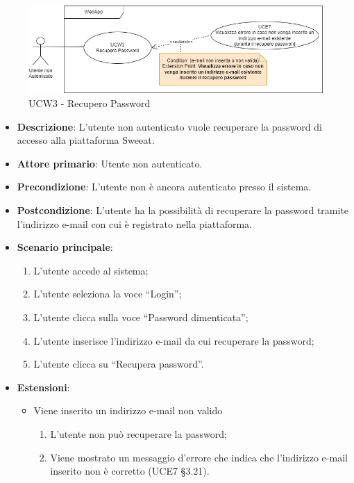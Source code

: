 \begin{figure}[!h]
\centering
\includegraphics[scale=0.5]{UC_images/UCW3.png}
\caption{UCW3 - Recupero Password}
\end{figure}
\begin{itemize}
\item \textbf{Descrizione}: L'utente non autenticato vuole recuperare la password di accesso alla piattaforma Sweeat.
\item \textbf{Attore primario}: Utente non autenticato.
\item \textbf{Precondizione}: L’utente non è ancora autenticato presso il sistema.
\item \textbf{Postcondizione}: L’utente ha la possibilità di recuperare la password tramite l'indirizzo e-mail con cui è registrato nella piattaforma.

\item \textbf{Scenario principale}:
\begin{enumerate}
\item L’utente accede al sistema;
\item L’utente seleziona la voce “Login”;
\item L’utente clicca sulla voce “Password dimenticata”;
\item L’utente inserisce l’indirizzo e-mail da cui recuperare la password;
\item L’utente clicca su “Recupera password”. 
\end{enumerate}

\item \textbf{Estensioni}:
\begin{itemize}
\item Viene inserito un indirizzo e-mail non valido 
\begin{enumerate}
	\item L’utente non può recuperare la password;
	\item Viene mostrato un messaggio d’errore che indica che l’indirizzo e-mail inserito non è corretto (UCE7 §3.21).
\end{enumerate}
\end{itemize}
\end{itemize}

\pagebreak